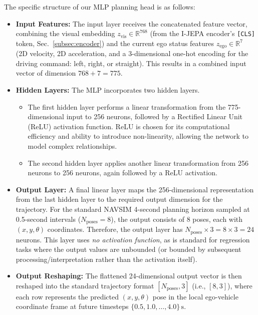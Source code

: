 \documentclass{article}
\begin{document}
The specific structure of our MLP planning head is as follows:
\begin{itemize}
    \item \textbf{Input Features:} The input layer receives the concatenated feature vector, combining the visual embedding $z_{\text{vis}} \in \mathbb{R}^{768}$ (from the I-JEPA encoder's \texttt{[CLS]} token, Sec.~\ref{subsec:encoder}) and the current ego status features $z_{\text{ego}} \in \mathbb{R}^{7}$ (2D velocity, 2D acceleration, and a 3-dimensional one-hot encoding for the driving command: left, right, or straight). This results in a combined input vector of dimension $768 + 7 = 775$.
    \item \textbf{Hidden Layers:} The MLP incorporates two hidden layers.
        \begin{itemize}
            \item The first hidden layer performs a linear transformation from the 775-dimensional input to 256 neurons, followed by a Rectified Linear Unit (ReLU) activation function. ReLU is chosen for its computational efficiency and ability to introduce non-linearity, allowing the network to model complex relationships.
            \item The second hidden layer applies another linear transformation from 256 neurons to 256 neurons, again followed by a ReLU activation.
        \end{itemize}
    \item \textbf{Output Layer:} A final linear layer maps the 256-dimensional representation from the last hidden layer to the required output dimension for the trajectory. For the standard NAVSIM 4-second planning horizon sampled at 0.5-second intervals ($N_{\text{poses}} = 8$), the output consists of 8 poses, each with $(x, y, \theta)$ coordinates. Therefore, the output layer has $N_{\text{poses}} \times 3 = 8 \times 3 = 24$ neurons. This layer uses \textit{no activation function}, as is standard for regression tasks where the output values are unbounded (or bounded by subsequent processing/interpretation rather than the activation itself).
    \item \textbf{Output Reshaping:} The flattened 24-dimensional output vector is then reshaped into the standard trajectory format $[N_{\text{poses}}, 3]$ (i.e., $[8, 3]$), where each row represents the predicted $(x, y, \theta)$ pose in the local ego-vehicle coordinate frame at future timesteps $\{0.5, 1.0, \dots, 4.0\}\,\text{s}$.
\end{itemize}
\end{document}
